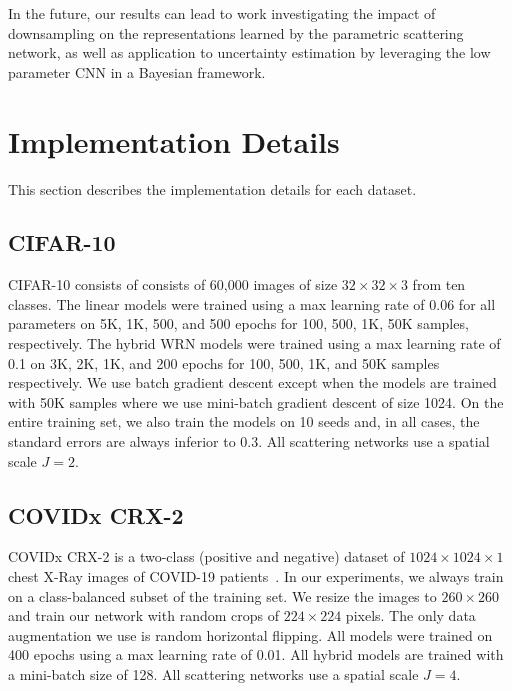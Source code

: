 \documentclass[10pt,twocolumn,letterpaper]{article}
\begin{document}
 In the future, our results can lead to work investigating the impact of downsampling on the representations learned by the parametric scattering network, as well as application to uncertainty estimation by leveraging the low parameter CNN in a Bayesian framework.





{\small


}
\clearpage
\appendix
\setcounter{page}{1}
\onecolumn
\section{Implementation Details}
\label{appendix-details}
This section describes the implementation details for each dataset.
\subsection{CIFAR-10}
\label{appendix:cifar}
CIFAR-10 consists of consists of 60,000 images of size $32 \times 32 \times 3$ from ten classes. The linear models were trained using a max learning rate of 0.06 for all parameters on 5K, 1K, 500, and 500 epochs for 100, 500, 1K, 50K samples, respectively. The hybrid WRN models were trained using a max learning rate of 0.1 on 3K, 2K, 1K, and 200 epochs for 100, 500, 1K, and 50K samples respectively. We use batch gradient descent except when the models are trained with 50K samples where we use mini-batch gradient descent of size 1024. On the entire training set, we also train the models on 10 seeds and, in all cases, the standard errors are always inferior to $0.3 $. All scattering networks use a spatial scale $J=2$.

\subsection{COVIDx CRX-2}
COVIDx CRX-2 is a two-class (positive and negative) dataset of $1024 \times 1024 \times 1$ chest X-Ray images of COVID-19 patients~\cite{Wang2020}. In our experiments, we always train on a class-balanced subset of the training set. We resize the images to $260 \times 260$ and train our network with random crops of $224 \times 224$ pixels. The only data augmentation we use is random horizontal flipping. All models were trained on 400 epochs using a max learning rate of 0.01. All hybrid models are trained with a mini-batch size of 128. All scattering networks use a spatial scale $J=4$.
\end{document}
